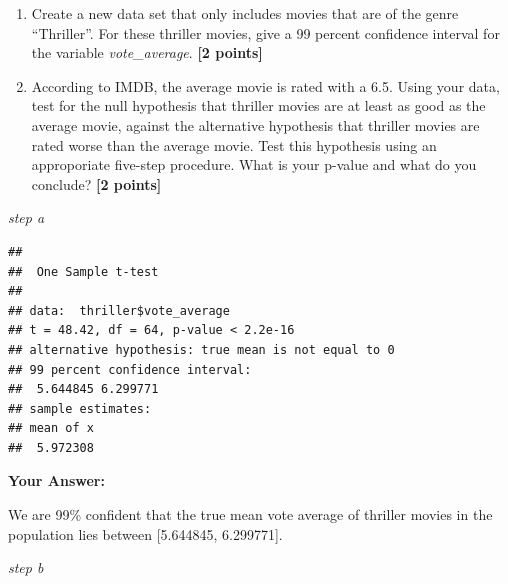 \documentclass[
]{article}
\newenvironment{Shaded}{\begin{snugshade}}{\end{snugshade}}
\newcommand{\AttributeTok}[1]{\textcolor[rgb]{0.13,0.29,0.53}{#1}}
\newcommand{\CommentTok}[1]{\textcolor[rgb]{0.56,0.35,0.01}{\textit{#1}}}
\newcommand{\FloatTok}[1]{\textcolor[rgb]{0.00,0.00,0.81}{#1}}
\newcommand{\FunctionTok}[1]{\textcolor[rgb]{0.13,0.29,0.53}{\textbf{#1}}}
\newcommand{\NormalTok}[1]{#1}
\newcommand{\OtherTok}[1]{\textcolor[rgb]{0.56,0.35,0.01}{#1}}
\newcommand{\SpecialCharTok}[1]{\textcolor[rgb]{0.81,0.36,0.00}{\textbf{#1}}}
\newcommand{\StringTok}[1]{\textcolor[rgb]{0.31,0.60,0.02}{#1}}
\begin{document}
\begin{enumerate}
\def\labelenumi{\alph{enumi}.}
\item
  Create a new data set that only includes movies that are of the genre
  ``Thriller''. For these thriller movies, give a 99 percent confidence
  interval for the variable \emph{vote\_average}. \textbf{[2 points]}
\item
  According to IMDB, the average movie is rated with a 6.5. Using your
  data, test for the null hypothesis that thriller movies are at least
  as good as the average movie, against the alternative hypothesis that
  thriller movies are rated worse than the average movie. Test this
  hypothesis using an approporiate five-step procedure. What is your
  p-value and what do you conclude? \textbf{[2 points]}
\end{enumerate}

\emph{step a}

\begin{Shaded}
\end{Shaded}

\begin{verbatim}
## 
##  One Sample t-test
## 
## data:  thriller$vote_average
## t = 48.42, df = 64, p-value < 2.2e-16
## alternative hypothesis: true mean is not equal to 0
## 99 percent confidence interval:
##  5.644845 6.299771
## sample estimates:
## mean of x 
##  5.972308
\end{verbatim}

\textbf{Your Answer:}

We are 99\% confident that the true mean vote average of thriller movies
in the population lies between {[}5.644845, 6.299771{]}.

\emph{step b}

\begin{Shaded}
\end{Shaded}
\end{document}
